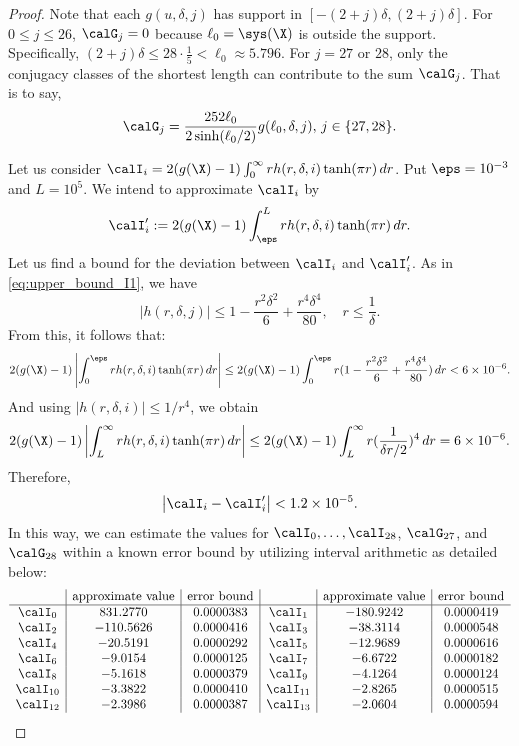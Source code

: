 \begin{proof}
Note that each 
$g(u, \delta, j)$ has support in $[-(2+j)\delta, (2+j)\delta]$.
For $0\leq j \leq 26$, $\calG_{j}=0$ because $\ell_0 =\sys(\X)$ is outside the support.
Specifically, $(2+j)\delta\leq 28\cdot \frac{1}{5} <\ell_0 \approx 5.796$.
For $j=27$ or $28$, only the conjugacy classes of the shortest length can contribute to the sum $\calG_j$.
That is to say,
\[
\calG_{j} = \frac{252\ell_0}{2 \sinh(\ell_0/2)}g(\ell_0, \delta, j),\, j\in \{27, 28\}.
\]

Let us consider $\calI_i = 2(g(\X)-1)\int_0^\infty r h(r , \delta, i) \tanh(\pi r) \,dr$.
Put $\eps=10^{-3}$ and $L=10^5$.
We intend to approximate $\calI_i$ by
\[
\calI_i' : = 2(g(\X)-1)\int_\eps^L r h(r , \delta, i) \tanh(\pi r) \,dr.
\]
Let us find a bound for the deviation between $\calI_i$ and $\calI_i'$.
As in \eqref{eq:upper_bound_I1}, we have
\[
\left|h(r, \delta, j)\right| \leq 1 - \frac{r^2 \delta^2}{6} + \frac{r^4 \delta^4}{80},\quad r\leq \frac{1}{\delta}.
\]
From this, it follows that:
\[
2(g(\X)-1)\left|\int_0^\eps r h(r , \delta, i) \tanh(\pi r) \,dr\right| \leq 
2(g(\X)-1)\int_0^\eps r(1 - \frac{r^2 \delta^2}{6} + \frac{r^4 \delta^4}{80})  \,dr
<6\times 10^{-6}.
\]
And using $|h(r,\delta, i)|\leq 1/r^4$, we obtain
\[
2(g(\X)-1)\left|\int_L^\infty r h(r , \delta, i) \tanh(\pi r) \,dr\right| \leq 
2(g(\X)-1)\int_L^\infty r(\frac{1}{\delta r/2})^4  \,dr
=6\times 10^{-6}.
\]
Therefore,
\[
\left|\calI_i - \calI_i' \right|<1.2\times 10^{-5}.
\]
In this way, we can estimate the values for $\calI_0,\dots, \calI_{28}$, $\calG_{27}$, and $\calG_{28}$ within a known error bound by utilizing interval arithmetic as detailed below:
\[
\begin{array}{c|c|c|c|c|c}
& \text{approximate value} & \text{error bound} & & \text{approximate value} & \text{error bound} \\
\hline
\calI_{0} & 831.2770 & 0.0000383 & \calI_{1} & -180.9242 & 0.0000419 \\
\calI_{2} & -110.5626 & 0.0000416 & \calI_{3} & -38.3114 & 0.0000548 \\
\calI_{4} & -20.5191 & 0.0000292 & \calI_{5} & -12.9689 & 0.0000616 \\
\calI_{6} & -9.0154 & 0.0000125 & \calI_{7} & -6.6722 & 0.0000182 \\
\calI_{8} & -5.1618 & 0.0000379 & \calI_{9} & -4.1264 & 0.0000124 \\
\calI_{10} & -3.3822 & 0.0000410 & \calI_{11} & -2.8265 & 0.0000515 \\
\calI_{12} & -2.3986 & 0.0000387 & \calI_{13} & -2.0604 & 0.0000594 \\

\end{array}\]
\end{proof}
